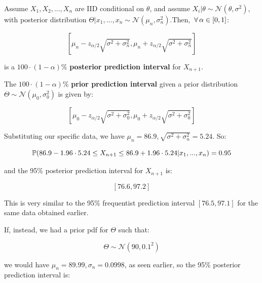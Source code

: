 \documentclass[a4paper]{article}
\begin{document}
                \begin{definition}
                    Assume $X_1, X_2, ..., X_n$ are IID conditional on $\theta$,
                    and assume $X_i | \theta \sim \mathcal{N}(\theta, \sigma^2
                    )$, with posterior distribution $\Theta | x_1, ..., x_n \sim
                    \mathcal{N}(\mu_n, \sigma_n^2)$.Then, $\,\forall\, \alpha \in [0,
                    1]$:

                    \[
                        \left[\mu_n - z_{\alpha/2} \sqrt{\sigma^2 + \sigma_n^2},
                        \mu_n + z_{\alpha/2} \sqrt{\sigma^2 + \sigma_n^2}\right]
                    \]

                    is a $100 \cdot (1 - \alpha)\%$ \textbf{posterior prediction
                    interval} for $X_{n + 1}$.

                    The $100 \cdot (1 - \alpha)\%$ \textbf{prior prediction
                    interval} given a prior distribution $\Theta \sim
                    \mathcal{N}(\mu_0, \sigma_0^2)$ is given by:

                    \[
                        \left[\mu_0 - z_{\alpha/2} \sqrt{\sigma^2 + \sigma_0^2},
                        \mu_0 + z_{\alpha/2} \sqrt{\sigma^2 + \sigma_0^2}\right]
                    \]
                \end{definition}

                Substituting our specific data, we have $\mu_n = 86.9, \sqrt{
                \sigma^2 + \sigma_n^2} = 5.24$. So:

                $$
                    \mathbb{P}(86.9 - 1.96 \cdot 5.24 \leq X_{n+1} \leq 86.9 + 1.96
                    \cdot 5.24 | x_1, ..., x_n) = 0.95
                $$

                and the 95\% posterior prediction interval for $X_{n+1}$ is:

                $$
                    [76.6, 97.2]
                $$

                This is very similar to the 95\% frequentist prediction interval
                $[76.5, 97.1]$ for the same data obtained earlier.

                If, instead, we had a prior pdf for $\Theta$ such that:

                $$
                    \Theta \sim \mathcal{N}(90, 0.1^2)
                $$

                we would have $\mu_n = 89.99, \sigma_n = 0.0998$, as seen
                earlier, so the 95\% posterior prediction interval is:
\end{document}
